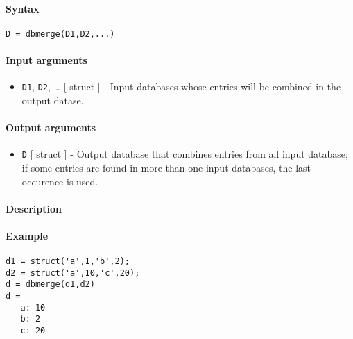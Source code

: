 


	\paragraph{Syntax}

\begin{verbatim}
D = dbmerge(D1,D2,...)
\end{verbatim}

\paragraph{Input arguments}

\begin{itemize}
\itemsep1pt\parskip0pt
\item
  \texttt{D1}, \texttt{D2}, \ldots{} {[} struct {]} - Input databases
  whose entries will be combined in the output datase.
\end{itemize}

\paragraph{Output arguments}

\begin{itemize}
\itemsep1pt\parskip0pt
\item
  \texttt{D} {[} struct {]} - Output database that combines entries from
  all input database; if some entries are found in more than one input
  databases, the last occurence is used.
\end{itemize}

\paragraph{Description}

\paragraph{Example}

\begin{verbatim}
d1 = struct('a',1,'b',2);
d2 = struct('a',10,'c',20);
d = dbmerge(d1,d2)
d =
   a: 10
   b: 2
   c: 20
\end{verbatim}


